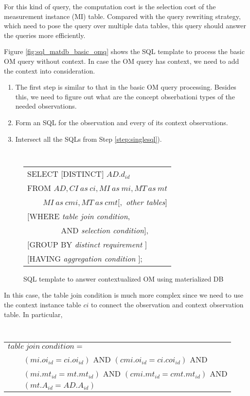 For this kind of query, the computation cost is the selection cost of the
measurement instance (MI) table.
Compared with the query rewriting strategy, which need to pose the
query over multiple data tables, this query should answer the queries
more efficiently.

Figure \ref{fig:sql_matdb_basic_omq} shows the SQL template to process
the basic OM query without context. In case the OM query has context,
we need to add the context into consideration.

\begin{enumerate}
\item The first step is similar to that in the basic OM query
  processing. Besides this, we need to figure out what are the concept
  obserbationi types of the needed observations.
\item \label{step:singlesql} Form an SQL for the observation and every of its context
  observations.
\item Intersect all the SQLs from Step \ref{step:singlesql}).
\end{enumerate}


\begin{figure}[htb]
{\tt
\begin{tabular}{l}
SELECT $[$DISTINCT$]$ $AD.d_{id}$\\
FROM $AD, CI~as~ci,MI~as~mi, MT~as~mt$\\
$\qquad MI~as~cmi, MT~as~cmt[,$ {\em other tables}$]$\\
$[$WHERE    {\em table join condition}, \\
$\qquad\qquad$ AND {\em selection condition}$]$,\\
$[$GROUP BY {\em distinct requirement} $]$\\
$[$HAVING   {\em aggregation condition} $]$;
\end{tabular}
}
\caption{SQL template to answer contextualized OM using materialized DB}
\label{fig:sql_matdb_context_omq}
\end{figure}

In this case, the table join condition is much more complex since we
need to use the context instance table $ci$ to connect the
observation and context observation table.
In particular,

\vspace{0.1in}
{\tt
\begin{tabular}{l}
$table~join~condition=$\\
$\qquad (mi.oi_{id}=ci.oi_{id})$ AND $(cmi.oi_{id}=ci.coi_{id})$ AND\\
$\qquad (mi.mt_{id}=mt.mt_{id})$ AND $(cmi.mt_{id}=cmt.mt_{id})$ AND\\
$\qquad (mt.A_{id}=AD.A_{id})$
\end{tabular}
}
\vspace{0.1in}

